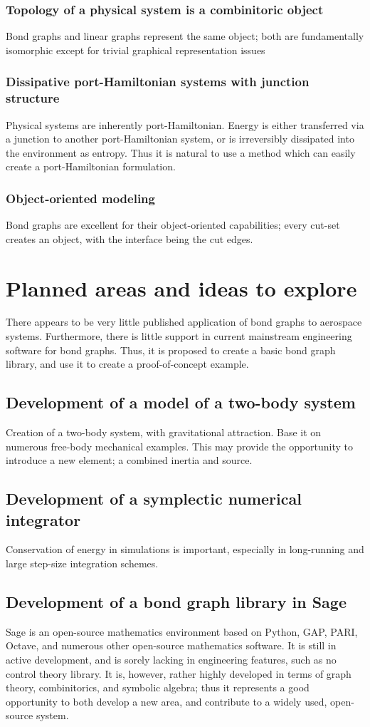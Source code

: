 \documentclass[utf,a4paper,12pt]{report}
\begin{document}
\subsection{Topology of a physical system is a combinitoric object}
Bond graphs and linear graphs represent the same object; both are fundamentally isomorphic except for trivial graphical representation issues
\subsection{Dissipative port-Hamiltonian systems with junction structure}
Physical systems are inherently port-Hamiltonian. Energy is either transferred via a junction to another port-Hamiltonian system, or is irreversibly dissipated into the environment as entropy. Thus it is natural to use a method which can easily create a port-Hamiltonian formulation.
\subsection{Object-oriented modeling}
Bond graphs are excellent for their object-oriented capabilities; every cut-set creates an object, with the interface being the cut edges.
\chapter{Planned areas and ideas to explore}
There appears to be very little published application of bond graphs to aerospace systems. Furthermore, there is little support in current mainstream engineering software for bond graphs. Thus, it is proposed to create a basic bond graph library, and use it to create a proof-of-concept example.
\section{Development of a model of a two-body system}
Creation of a two-body system, with gravitational attraction. Base it on numerous free-body mechanical examples. This may provide the opportunity to introduce a new element; a combined inertia and source. 
\section{Development of a symplectic numerical integrator}
Conservation of energy in simulations is important, especially in long-running and large step-size integration schemes.
\section{Development of a bond graph library in Sage}
Sage is an open-source mathematics environment based on Python, GAP, PARI, Octave, and numerous other open-source mathematics software. It is still in active development, and is sorely lacking in engineering features, such as no control theory library. It is, however, rather highly developed in terms of graph theory, combinitorics, and symbolic algebra; thus it represents a good opportunity to both develop a new area, and contribute to a widely used, open-source system.
\end{document}
